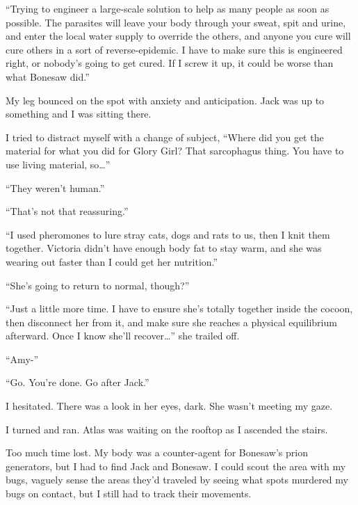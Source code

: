 ``Trying to engineer a large-scale solution to help as many people as soon as possible.  The parasites will leave your body through your sweat, spit and urine, and enter the local water supply to override the others, and anyone you cure will cure others in a sort of reverse-epidemic.  I have to make sure this is engineered right, or nobody's going to get cured.  If I screw it up, it could be worse than what Bonesaw did.''



My leg bounced on the spot with anxiety and anticipation.  Jack was up to something and I was sitting there.



I tried to distract myself with a change of subject, ``Where did you get the material for what you did for Glory Girl?  That sarcophagus thing.  You have to use living material, so\ldots''



``They weren't human.''



``That's not that reassuring.''



``I used pheromones to lure stray cats, dogs and rats to us, then I knit them together.  Victoria didn't have enough body fat to stay warm, and she was wearing out faster than I could get her nutrition.''



``She's going to return to normal, though?''



``Just a little more time.  I have to ensure she's totally together inside the cocoon, then disconnect her from it, and make sure she reaches a physical equilibrium afterward.  Once I know she'll recover\ldots'' she trailed off.



``Amy-''



``Go.  You're done.  Go after Jack.''



I hesitated.  There was a look in her eyes, dark.  She wasn't meeting my gaze.



I turned and ran.  Atlas was waiting on the rooftop as I ascended the stairs.



Too much time lost.  My body was a counter-agent for Bonesaw's prion generators, but I had to find Jack and Bonesaw.  I could scout the area with my bugs, vaguely sense the areas they'd traveled by seeing what spots murdered my bugs on contact, but I still had to track their movements.



